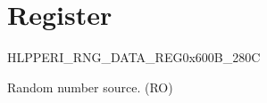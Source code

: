 \documentclass[main\_\_EN.tex]{subfiles}
\begin{document}
\section{Register}

\begin{register}{H}{LPPERI\_RNG\_DATA\_REG}{0x600B\_280C}\label{regdesc:LPPERIRNGDATAREG}
%
\regnewline%
\begin{regdesc}\begin{reglist}
\item [LPPERI\_RNG\_DATA] Random number source. (RO)
\end{reglist}\end{regdesc}
\end{register}
\end{document}
